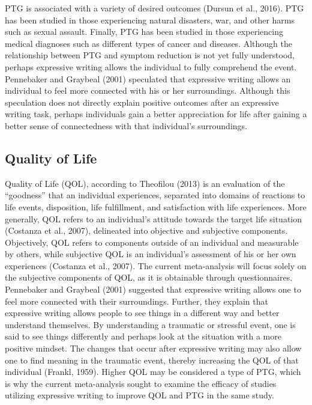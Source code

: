 \documentclass[english,man, mask]{apa6}
\theoremstyle{definition}
\theoremstyle{definition}
\theoremstyle{definition}
\theoremstyle{remark}
\begin{document}
PTG is associated with a variety of desired outcomes (Dursun et al.,
2016). PTG has been studied in those experiencing natural disasters,
war, and other harms such as sexual assault. Finally, PTG has been
studied in those experiencing medical diagnoses such as different types
of cancer and diseases. Although the relationship between PTG and
symptom reduction is not yet fully understood, perhaps expressive
writing allows the individual to fully comprehend the event. Pennebaker
and Graybeal (2001) speculated that expressive writing allows an
individual to feel more connected with his or her surroundings. Although
this speculation does not directly explain positive outcomes after an
expressive writing task, perhaps individuals gain a better appreciation
for life after gaining a better sense of connectedness with that
individual's surroundings.

\subsection{Quality of Life}\label{quality-of-life}

Quality of Life (QOL), according to Theofilou (2013) is an evaluation of
the \enquote{goodness} that an individual experiences, separated into
domains of reactions to life events, disposition, life fulfillment, and
satisfaction with life experiences. More generally, QOL refers to an
individual's attitude towards the target life situation (Costanza et
al., 2007), delineated into objective and subjective components.
Objectively, QOL refers to components outside of an individual and
measurable by others, while subjective QOL is an individual's assessment
of his or her own experiences (Costanza et al., 2007). The current
meta-analysis will focus solely on the subjective components of QOL, as
it is obtainable through questionnaires. Pennebaker and Graybeal (2001)
suggested that expressive writing allows one to feel more connected with
their surroundings. Further, they explain that expressive writing allows
people to see things in a different way and better understand
themselves. By understanding a traumatic or stressful event, one is said
to see things differently and perhaps look at the situation with a more
positive mindset. The changes that occur after expressive writing may
also allow one to find meaning in the traumatic event, thereby
increasing the QOL of that individual (Frankl, 1959). Higher QOL may be
considered a type of PTG, which is why the current meta-analysis sought
to examine the efficacy of studies utilizing expressive writing to
improve QOL and PTG in the same study.
\end{document}
